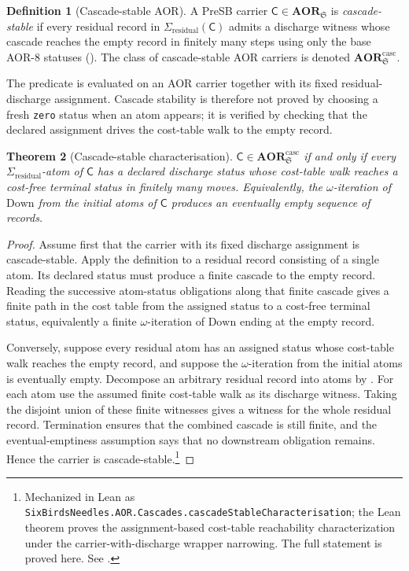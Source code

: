 \documentclass[11pt]{article}
\newcommand{\AOR}{\mathbf{AOR}}
\newcommand{\CascadeStableAOR}{\mathbf{AOR}^{\mathrm{casc}}}
\newcommand{\Sigres}{\Sigma_{\mathrm{residual}}}
\newtheorem{theorem}{Theorem}[section]
\theoremstyle{definition}
\newtheorem{definition}[theorem]{Definition}
\begin{document}
\begin{definition}[Cascade-stable AOR]\label{def:aor:cascade-stable-aor}
A PreSB carrier $\mathsf C\in\AOR_{\mathfrak S}$ is
\emph{cascade-stable} if every residual record in $\Sigres(\mathsf C)$
admits a discharge witness whose cascade reaches the empty record in
finitely many steps using only the base AOR-8 statuses
().  The class of cascade-stable AOR
carriers is denoted $\CascadeStableAOR_{\mathfrak S}$.
\end{definition}

The predicate is evaluated on an AOR carrier together with its fixed
residual-discharge assignment.  Cascade stability is therefore not
proved by choosing a fresh \texttt{zero} status when an atom appears;
it is verified by checking that the declared assignment drives the
cost-table walk to the empty record.

\begin{theorem}[Cascade-stable characterisation]\label{thm:aor:cascade-stable-characterisation}
$\mathsf C\in\CascadeStableAOR_{\mathfrak S}$ if and only if every
$\Sigres$-atom of $\mathsf C$ has a declared discharge status whose
cost-table walk reaches a cost-free terminal status in finitely many
moves.  Equivalently, the $\omega$-iteration of $\mathrm{Down}$ from
the initial atoms of $\mathsf C$ produces an eventually empty sequence
of records.
\end{theorem}

\begin{proof}
Assume first that the carrier with its fixed discharge assignment is
cascade-stable.  Apply the definition to a residual record consisting of a
single atom.  Its declared status must produce a finite cascade to the empty
record.  Reading the successive atom-status obligations along that finite
cascade gives a finite path in the cost table from the assigned status to a
cost-free terminal status, equivalently a finite \(\omega\)-iteration of
\(\mathrm{Down}\) ending at the empty record.

Conversely, suppose every residual atom has an assigned status whose
cost-table walk reaches the empty record, and suppose the \(\omega\)-iteration
from the initial atoms is eventually empty.  Decompose an arbitrary residual
record into atoms by .  For each atom use
the assumed finite cost-table walk as its discharge witness.  Taking the
disjoint union of these finite witnesses gives a witness for the whole
residual record.  Termination ensures that the combined cascade is still
finite, and the eventual-emptiness assumption says that no downstream
obligation remains.  Hence the carrier is cascade-stable.\footnote{Mechanized in Lean as \texttt{SixBirdsNeedles.AOR.Cascades.cascadeStableCharacterisation}; the Lean theorem proves the assignment-based cost-table reachability characterization under the carrier-with-discharge wrapper narrowing. The full statement is proved here. See .}
\end{proof}
\end{document}

